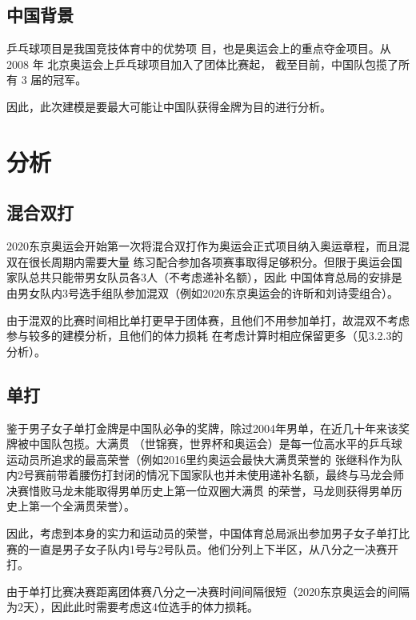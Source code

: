\documentclass[a4paper,AutoFakeBold,AutoFakeSlant]{ctexart}
\begin{document}
\subsection{中国背景}
乒乓球项目是我国竞技体育中的优势项
目，也是奥运会上的重点夺金项目。从 2008 年
北京奥运会上乒乓球项目加入了团体比赛起，
截至目前，中国队包揽了所有 3 届的冠军。

因此，此次建模是要最大可能让中国队获得金牌为目的进行分析。


\section{分析}

\subsection{混合双打}
2020东京奥运会开始第一次将混合双打作为奥运会正式项目纳入奥运章程，而且混双在很长周期内需要大量
练习配合参加各项赛事取得足够积分。但限于奥运会国家队总共只能带男女队员各3人（不考虑递补名额），因此
中国体育总局的安排是由男女队内3号选手组队参加混双（例如2020东京奥运会的许昕和刘诗雯组合）。

由于混双的比赛时间相比单打更早于团体赛，且他们不用参加单打，故混双不考虑参与较多的建模分析，且他们的体力损耗
在考虑计算时相应保留更多（见3.2.3的分析）。

\subsection{单打}
鉴于男子女子单打金牌是中国队必争的奖牌，除过2004年男单，在近几十年来该奖牌被中国队包揽。大满贯
（世锦赛，世界杯和奥运会）是每一位高水平的乒乓球运动员所追求的最高荣誉（例如2016里约奥运会最快大满贯荣誉的
张继科作为队内2号赛前带着腰伤打封闭的情况下国家队也并未使用递补名额，最终与马龙会师决赛惜败马龙未能取得男单历史上第一位双圈大满贯
的荣誉，马龙则获得男单历史上第一个全满贯荣誉）。

因此，考虑到本身的实力和运动员的荣誉，中国体育总局派出参加男子女子单打比赛的一直是男子女子队内1号与2号队员。他们分列上下半区，从八分之一决赛开打。

由于单打比赛决赛距离团体赛八分之一决赛时间间隔很短（2020东京奥运会的间隔为2天），因此此时需要考虑这4位选手的体力损耗。
\end{document}
